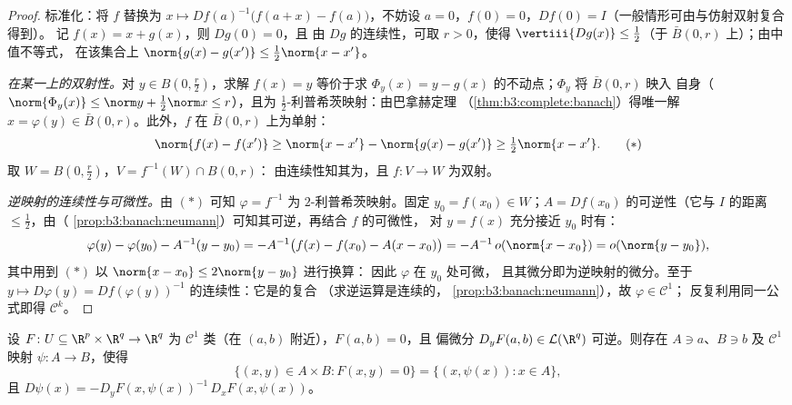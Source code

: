 \begin{proof}
标准化：将 $f$ 替换为 $x \mapsto Df(a)^{-1}\bigl(f(a +
x) - f(a)\bigr)$，不妨设 $a = 0$，$f(0) = 0$，$Df(0) =
I$（一般情形可由与仿射双射复合得到）。
记 $f(x) = x + g(x)$，则 $Dg(0) = 0$，且
由 $Dg$ 的连续性，可取 $r > 0$，使得
$\vertiii{Dg(x)} \leq \frac12$（于 $\bar B(0, r)$ 上）；由中值不等式，
在该集合上 $\norm{g(x) - g(x')} \leq \frac12
\norm{x - x'}$。

\emph{在某一上的双射性。}对 $y \in B(0,
\frac r2)$，求解 $f(x) = y$ 等价于求
$\Phi_y(x) = y - g(x)$ 的不动点；$\Phi_y$ 将 $\bar B(0, r)$ 映入
自身（$\norm{\Phi_y(x)} \leq \norm y + \frac12\norm x \leq
r$），且为 $\frac12$-利普希茨映射：由巴拿赫定理
（\cref{thm:b3:complete:banach}）得唯一解
$x = \varphi(y) \in \bar B(0,r)$。此外，$f$ 在
$\bar B(0,r)$ 上为单射：
\[
\norm{f(x) - f(x')} \geq \norm{x - x'} - \norm{g(x) - g(x')}
\geq \tfrac12\norm{x - x'} .
\tag{$*$}
\]
取 $W = B(0, \frac r2)$，$V = f^{-1}(W)\cap B(0, r)$：
由连续性知其为，且 $f \colon V \to W$ 为双射。

\emph{逆映射的连续性与可微性。}由 $(*)$ 可知
$\varphi = f^{-1}$ 为 $2$-利普希茨映射。固定 $y_0 = f(x_0)
\in W$；$A = Df(x_0)$ 的可逆性（它与 $I$ 的距离
$\leq \frac12$，由（
\cref{prop:b3:banach:neumann}）可知其可逆，再结合 $f$ 的可微性，
对 $y = f(x)$ 充分接近 $y_0$ 时有：
\[
\varphi(y) - \varphi(y_0) - A^{-1}(y - y_0)
= -A^{-1}\bigl(f(x) - f(x_0) - A(x - x_0)\bigr)
= -A^{-1}\,o(\norm{x - x_0}) = o(\norm{y - y_0}),
\]
其中用到 $(*)$ 以 $\norm{x - x_0} \leq 2\norm{y - y_0}$ 进行换算：
因此 $\varphi$ 在 $y_0$ 处可微，
且其微分即为逆映射的微分。至于 $y \mapsto D\varphi(y) =
Df(\varphi(y))^{-1}$ 的连续性：它是的复合
（求逆运算是连续的，
\cref{prop:b3:banach:neumann}），故 $\varphi \in \mathcal C^1$；
反复利用同一公式即得 $\mathcal C^k$。
\end{proof}

\begin{theorem}[隐函数定理]
\label{thm:b3:submanifolds:implicit}
设 $F \colon U \subseteq \R^p\times\R^q \to \R^q$ 为
$\mathcal C^1$ 类（在 $(a, b)$ 附近），$F(a,b) = 0$，且
偏微分 $D_yF(a,b) \in \mathcal L(\R^q)$
可逆。则存在 $A \ni a$、$B \ni b$
及 $\mathcal C^1$ 映射 $\psi \colon A \to B$，使得
\[
\bigl\{(x, y)\in A\times B : F(x,y) = 0\bigr\}
= \{(x, \psi(x)) : x \in A\},
\]
且 $D\psi(x) = -D_yF(x, \psi(x))^{-1}\,D_xF(x,
\psi(x))$。
\end{theorem}

